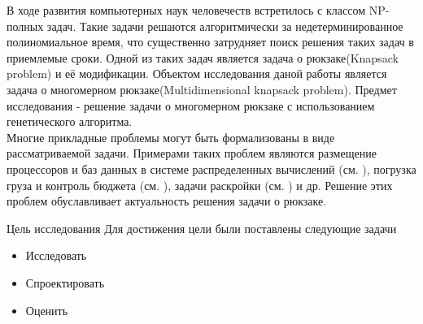 ﻿
В ходе развития компьютерных наук человечеств встретилось с классом NP-полных задач. Такие задачи решаются алгоритмически за недетерминированное полиномиальное время, что существенно затрудняет поиск решения таких задач в приемлемые сроки.
 Одной из таких задач является задача о рюкзаке(Knapsack problem) и её модификации.
 Объектом исследования даной работы является задача о многомерном рюкзаке(Multidimensional knapsack problem).
 Предмет исследования - решение задачи о многомерном рюкзаке с использованием генетического алгоритма.
\\Многие прикладные проблемы могут быть формализованы в виде рассматриваемой задачи. Примерами таких проблем являются размещение процессоров
и баз данных в системе распределенных вычислений (см. \cite{Гэвиш1982}), погрузка груза и контроль бюджета (см. \cite{Ших1979}), задачи раскройки (см. \cite{Гилмор1966}) и др. 
Решение этих проблем обуславливает актуальность решения задачи о рюкзаке.

Цель исследования
Для достижения цели были поставлены следующие задачи
\begin{itemize}
\item Исследовать
\item Спроектировать
\item Оценить
\end{itemize} 
